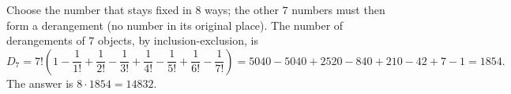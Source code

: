 Choose the number that stays fixed in $8$ ways; the other $7$ numbers must then form a derangement (no number in its original place). The number of derangements of $7$ objects, by inclusion-exclusion, is
\[
D_7=7!\left(1-\dfrac{1}{1!}+\dfrac{1}{2!}-\dfrac{1}{3!}+\dfrac{1}{4!}-\dfrac{1}{5!}+\dfrac{1}{6!}-\dfrac{1}{7!}\right)=5040-5040+2520-840+210-42+7-1=1854 .
\]
The answer is $8\cdot1854=\boxed{14832}$.
